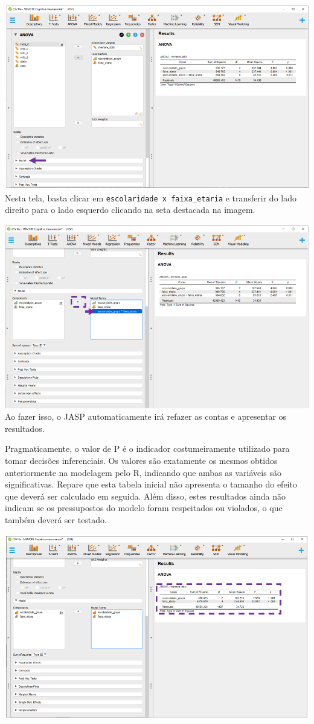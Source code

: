 \documentclass[
]{book}
\begin{document}
\includegraphics{./img/cap_anova_two_way_model_interface.png}
Nesta tela, basta clicar em \texttt{escolaridade\ x\ faixa\_etaria} e transferir do lado direito para o lado esquerdo clicando na seta destacada na imagem.

\includegraphics{./img/cap_anova_two_way_model2.png}
Ao fazer isso, o JASP automaticamente irá refazer as contas e apresentar os resultados.

Pragmaticamente, o valor de P é o indicador costumeiramente utilizado para tomar decisões inferenciais. Os valores são exatamente os mesmos obtidos anteriormente na modelagem pelo R, indicando que ambas as variáveis são significativas. Repare que esta tabela inicial não apresenta o tamanho do efeito que deverá ser calculado em seguida. Além disso, estes resultados ainda não indicam se os pressupostos do modelo foram respeitados ou violados, o que também deverá ser testado.

\includegraphics{./img/cap_anova_two_way_resultados.png}
\end{document}
